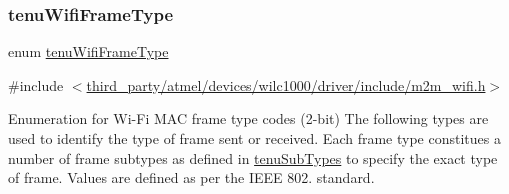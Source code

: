 \subsubsection{\texorpdfstring{tenu\+Wifi\+Frame\+Type}{tenuWifiFrameType}}
{\footnotesize\ttfamily enum \hyperlink{group__WlanEnums_ga593eb9b713b71fcc9cae6e81393b40d9}{tenu\+Wifi\+Frame\+Type}}



{\ttfamily \#include $<$\hyperlink{m2m__wifi_8h}{third\+\_\+party/atmel/devices/wilc1000/driver/include/m2m\+\_\+wifi.\+h}$>$}



Enumeration for Wi-\/\+Fi M\+AC frame type codes (2-\/bit) The following types are used to identify the type of frame sent or received. Each frame type constitues a number of frame subtypes as defined in \hyperlink{group__WlanEnums_gaef9606d02acd4b3ce5497f5eb4176f2a}{tenu\+Sub\+Types} to specify the exact type of frame. Values are defined as per the I\+E\+EE 802. standard. 

